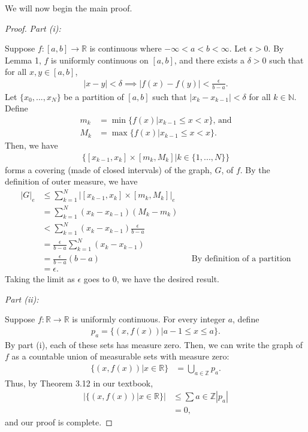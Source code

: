 \documentclass[10pt,a4paper]{article}
\makeatletter
\theoremstyle{theorem}
\newcommand{\proofpart}[2]{%
  \par
  \addvspace{\medskipamount}%
  \noindent\emph{Part #1: #2}\par\nobreak
  \addvspace{\smallskipamount}%
  \@afterheading
}
\theoremstyle{definition}
\makeatother
\begin{document}
We will now begin the main proof.
\begin{proof}
\proofpart{(i)}{}
Suppose $f:[a,b] \to \mathbb{R}$ is continuous where $-\infty < a < b < \infty$. Let $\epsilon > 0$. By Lemma 1, $f$ is uniformly continuous on $[a, b]$, and there exists a $\delta > 0$ such that for all $x, y \in [a, b]$,
\begin{align*}
|x - y| < \delta \implies |f(x) - f(y)| < \frac{\epsilon}{b - a}.
\end{align*}
Let $\{x_0, ..., x_N\}$ be a partition of $[a, b]$ such that $|x_k - x_{k-1}| < \delta$ for all $k \in \mathbb{N}$. Define 
\begin{align*}
m_k &= \min\{f(x)| x_{k-1} \leq x < x\} \text{, and}\\
M_k &= \max\{f(x)| x_{k-1} \leq x < x\}.
\end{align*}
Then, we have
\begin{align*}
\{[x_{k-1}, x_k] \times [m_k, M_k] | k \in \{1, ..., N\} \}
\end{align*}
forms a covering (made of closed intervals) of the graph, $G$, of $f$. By the definition of outer measure, we have
\begin{align*}
|G|_e &\leq \sum_{k=1}^N |[x_{k-1}, x_k] \times [m_k, M_k]|_e\\
&= \sum_{k=1}^N (x_k - x_{k - 1}) (M_k - m_k)\\
&< \sum_{k=1}^N (x_k - x_{k - 1})\frac{\epsilon}{b - a} \\
&= \frac{\epsilon}{b - a}\sum_{k=1}^N (x_k - x_{k - 1})\\
&= \frac{\epsilon}{b - a} (b - a) &&\text{By definition of a partition}\\
&= \epsilon. 
\end{align*}
Taking the limit as $\epsilon$ goes to $0$, we have the desired result.
\proofpart{(ii)}{}
Suppose $f:\mathbb{R} \to \mathbb{R}$ is uniformly continuous. For every integer $a$, define 
\begin{align*}
p_a = \{(x, f(x))| a-1 \leq x \leq a\}.
\end{align*}
By part (i), each of these sets has measure zero. Then, we can write the graph of $f$ as a countable union of measurable sets with measure zero:
\begin{align*}
\{(x, f(x)) | x \in \mathbb{R} \} &= \bigcup_{a \in \mathbb{Z}} p_a.
\end{align*}
Thus, by Theorem 3.12 in our textbook,
\begin{align*}
|\{(x, f(x) )| x \in \mathbb{R} \}| &\leq \sum{a \in \mathbb{Z}} |p_a|\\
&= 0,
\end{align*}
and our proof is complete.
\end{proof}
\end{document}
